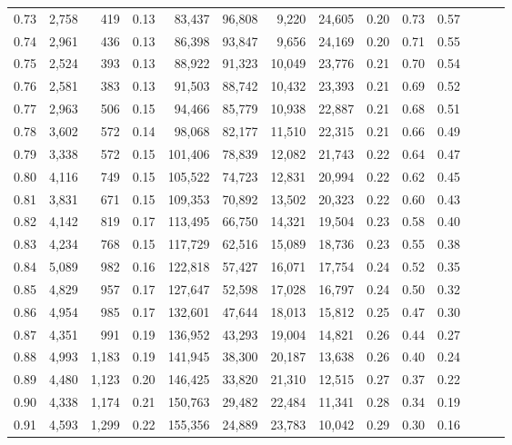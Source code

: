 \begin{tabular}{rrrrrrrrrrrrrr}
0.73 &  2,758 &    419 &  0.13 &   83,437 &   96,808 &   9,220 &  24,605 &  0.20 &  0.73 &      0.57 \\
0.74 &  2,961 &    436 &  0.13 &   86,398 &   93,847 &   9,656 &  24,169 &  0.20 &  0.71 &      0.55 \\
0.75 &  2,524 &    393 &  0.13 &   88,922 &   91,323 &  10,049 &  23,776 &  0.21 &  0.70 &      0.54 \\
0.76 &  2,581 &    383 &  0.13 &   91,503 &   88,742 &  10,432 &  23,393 &  0.21 &  0.69 &      0.52 \\
0.77 &  2,963 &    506 &  0.15 &   94,466 &   85,779 &  10,938 &  22,887 &  0.21 &  0.68 &      0.51 \\
0.78 &  3,602 &    572 &  0.14 &   98,068 &   82,177 &  11,510 &  22,315 &  0.21 &  0.66 &      0.49 \\
0.79 &  3,338 &    572 &  0.15 &  101,406 &   78,839 &  12,082 &  21,743 &  0.22 &  0.64 &      0.47 \\
0.80 &  4,116 &    749 &  0.15 &  105,522 &   74,723 &  12,831 &  20,994 &  0.22 &  0.62 &      0.45 \\
0.81 &  3,831 &    671 &  0.15 &  109,353 &   70,892 &  13,502 &  20,323 &  0.22 &  0.60 &      0.43 \\
0.82 &  4,142 &    819 &  0.17 &  113,495 &   66,750 &  14,321 &  19,504 &  0.23 &  0.58 &      0.40 \\
0.83 &  4,234 &    768 &  0.15 &  117,729 &   62,516 &  15,089 &  18,736 &  0.23 &  0.55 &      0.38 \\
0.84 &  5,089 &    982 &  0.16 &  122,818 &   57,427 &  16,071 &  17,754 &  0.24 &  0.52 &      0.35 \\
0.85 &  4,829 &    957 &  0.17 &  127,647 &   52,598 &  17,028 &  16,797 &  0.24 &  0.50 &      0.32 \\
0.86 &  4,954 &    985 &  0.17 &  132,601 &   47,644 &  18,013 &  15,812 &  0.25 &  0.47 &      0.30 \\
0.87 &  4,351 &    991 &  0.19 &  136,952 &   43,293 &  19,004 &  14,821 &  0.26 &  0.44 &      0.27 \\
0.88 &  4,993 &  1,183 &  0.19 &  141,945 &   38,300 &  20,187 &  13,638 &  0.26 &  0.40 &      0.24 \\
0.89 &  4,480 &  1,123 &  0.20 &  146,425 &   33,820 &  21,310 &  12,515 &  0.27 &  0.37 &      0.22 \\
0.90 &  4,338 &  1,174 &  0.21 &  150,763 &   29,482 &  22,484 &  11,341 &  0.28 &  0.34 &      0.19 \\
0.91 &  4,593 &  1,299 &  0.22 &  155,356 &   24,889 &  23,783 &  10,042 &  0.29 &  0.30 &      0.16 \\

\end{tabular}
